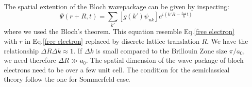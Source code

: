 \documentclass{article}
\begin{document}
The spatial extention of the Bloch wavepackage can be given by inspecting:
\begin{equation}
    \varPsi(r+R,t) = \sum_{k'} [ g(k') \psi_{nk} ] e^{i(k'R - \frac{\varepsilon_{nk}}{\hbar}t)}
\end{equation}
where we used the Bloch's theorem. This equation resemble Eq.\ref{free electron} with $r$ in Eq.\ref{free electron}
replaced by discrete lattice translation $R$. We have the relationship $\Delta R \Delta k \approx 1$. 
If $\Delta k$ is small compared to the Brillouin Zone size $\pi / a_0$, we need therefore $\Delta R \gg a_0$. The 
spatial dimension of the wave package of bloch electrons need to be over a few unit cell. The condition for 
the semiclassical theory follow the one for Sommerfeld case.
\end{document}
